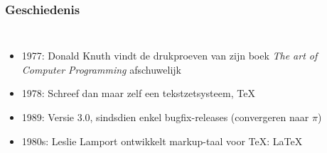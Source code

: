 \documentclass{beamer}
\begin{document}
\begin{frame}
  \frametitle{Geschiedenis}

  \begin{columns}[c]

    \begin{itemize}
    \item<+-> 1977: Donald Knuth vindt de drukproeven van zijn boek \emph{The art of Computer Programming} afschuwelijk
    \item<+-> 1978: Schreef dan maar zelf een tekstzetsysteem, {\TeX}
    \item<+-> 1989: Versie 3.0, sindsdien enkel bugfix-releases (convergeren naar $\pi$)
    \item<+-> 1980s: Leslie Lamport ontwikkelt markup-taal voor {\TeX}: {\LaTeX}
    \end{itemize}


\end{columns}
\end{frame}
\end{document}
